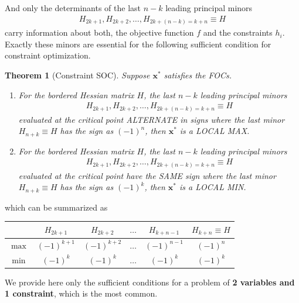 \documentclass[11pt,a4paper]{book}
\newtheorem{theorem}{Theorem}[section]
\theoremstyle{definition}\newtheorem{definition}{Definition}
\theoremstyle{definition}\newtheorem{fact}{Fact}
\theoremstyle{definition}\newtheorem{remark}{Remark}
\theoremstyle{definition}\newtheorem{ex}{Ex.}
\theoremstyle{definition}\newtheorem{project}{Project}
\theoremstyle{definition}\newtheorem{problem}{Problem}
\theoremstyle{definition}\newtheorem{example}{Example}
\newenvironment{ftheorem}
{\begin{mdframed}\begin{theorem}}
		{\end{theorem}\end{mdframed}}
\numberwithin{theorem}{section}
\numberwithin{corollary}{chapter}
\numberwithin{assumption}{chapter}
\numberwithin{definition}{chapter}
\numberwithin{prop}{chapter}
\numberwithin{notation}{chapter}
\numberwithin{problem}{chapter}
\numberwithin{example}{chapter}
\numberwithin{fact}{chapter}
\numberwithin{ex}{chapter}
\def\x{\mathbf x}
\begin{document}
	And only the determinants of the last $n - k$ leading principal minors 
	\begin{align*}
		H_{2k+1}, H_{2k+2}, \dots , H_{2k+(n - k) = k + n} \equiv H 
	\end{align*}
	carry information about both, the objective function $f$ and the constraints $h_i$. Exactly these minors are essential for the following sufficient condition for constraint optimization.
	
	
	
	\begin{ftheorem}[Constraint SOC]
		Suppose $\x^*$ satisfies the FOCs.
		\begin{enumerate}
			\item For the bordered Hessian matrix $H$, the last $n-k$ leading principal minors 
			\begin{align*}
				H_{2k+1}, H_{2k+2}, \dots , H_{2k+(n - k) = k + n} \equiv H 
			\end{align*}
			evaluated at the critical point ALTERNATE in signs where the last minor $H_{n+k} \equiv H$ has the sign as $(-1)^n$, then $\x^*$ is a LOCAL MAX.
			\item For the bordered Hessian matrix $H$, the last $n-k$ leading principal minors 
			\begin{align*}
				H_{2k+1}, H_{2k+2}, \dots , H_{2k+(n - k) = k + n} \equiv H 
			\end{align*}
			evaluated at the critical point have the SAME sign where the last minor $H_{n+k} \equiv H$ has the sign as $(-1)^k$, then $\x^*$ is a LOCAL MIN.
		\end{enumerate} \label{theorem:soc_constraint}
	\end{ftheorem}
	which can be summarized as
	\begin{table}[ht]
		\centering
		\begin{tabular}{c | c | c | c | c | c}
			\hline
			& $H_{2k+1}$   & $H_{2k+2}$   & $\dots$ & $H_{k+n-1}$  & $H_{k+n} \equiv H$ \\
			\hline
			$\max$ & $(-1)^{k+1}$ & $(-1)^{k+2}$ & $\dots$ & $(-1)^{n-1}$ & $(-1)^n$           \\
			$\min$ & $(-1)^k$     & $(-1)^k$     & $\dots$ & $(-1)^k$     & $(-1)^k$           \\
			\hline
		\end{tabular}
	\end{table}
	
	We provide here only the sufficient conditions for a problem of \textbf{2 variables and 1 constraint}, which is the most common.
	
\end{document}
